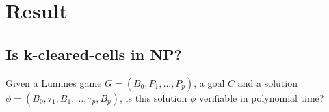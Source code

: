 \section{Result}
\subsection{Is k-cleared-cells in NP?}

Given a Lumines game $G = (B_0, P_1, \ldots, P_p)$, a goal $C$ and a solution $\phi = (B_0, \tau_1, B_1, \ldots ,\tau_p, B_p)$, is this solution $\phi$ verifiable in polynomial time?
